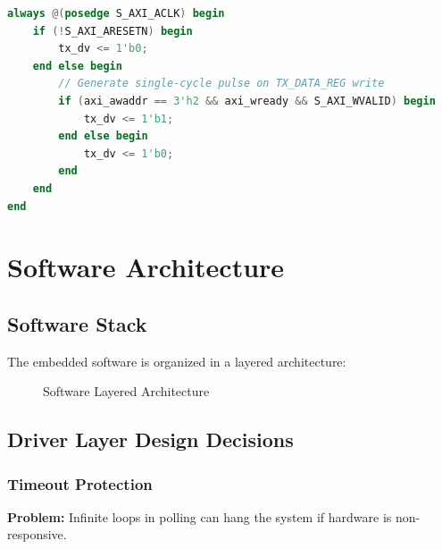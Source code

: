 \documentclass[11pt,a4paper]{article}
\begin{document}
\begin{lstlisting}[language=Verilog, caption=TX\_DV Pulse Generation]
always @(posedge S_AXI_ACLK) begin
    if (!S_AXI_ARESETN) begin
        tx_dv <= 1'b0;
    end else begin
        // Generate single-cycle pulse on TX_DATA_REG write
        if (axi_awaddr == 3'h2 && axi_wready && S_AXI_WVALID) begin
            tx_dv <= 1'b1;
        end else begin
            tx_dv <= 1'b0;
        end
    end
end
\end{lstlisting}

\section{Software Architecture}

\subsection{Software Stack}

The embedded software is organized in a layered architecture:

\begin{figure}[H]
\centering
{}
\caption{Software Layered Architecture}
\end{figure}

\subsection{Driver Layer Design Decisions}

\subsubsection{Timeout Protection}

\textbf{Problem:} Infinite loops in polling can hang the system if hardware is non-responsive.
\end{document}
